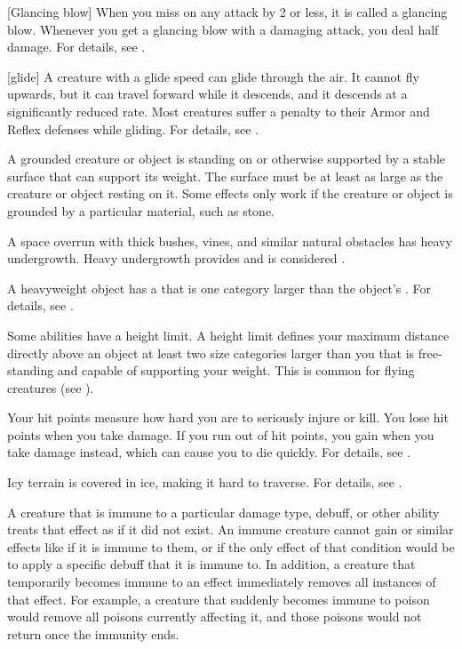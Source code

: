 [Glancing blow] When you miss on any attack by 2 or less, it is called a glancing blow.
Whenever you get a glancing blow with a damaging attack, you deal half damage.
For details, see .

[glide] A creature with a glide speed can glide through the air.
It cannot fly upwards, but it can travel forward while it descends, and it descends at a significantly reduced rate.
Most creatures suffer a  penalty to their Armor and Reflex defenses while gliding.
For details, see .

 A grounded creature or object is standing on or otherwise supported by a stable surface that can support its weight.
The surface must be at least as large as the creature or object resting on it.
Some effects only work if the creature or object is grounded by a particular material, such as stone. 

 A space overrun with thick bushes, vines, and similar natural obstacles has heavy undergrowth.
Heavy undergrowth provides  and is considered .

 A heavyweight object has a  that is one category larger than the object's .
For details, see .

 Some abilities have a height limit.
A height limit defines your maximum distance directly above an object at least two size categories larger than you that is free-standing and capable of supporting your weight.
This is common for flying creatures (see ).

 Your hit points measure how hard you are to seriously injure or kill.
You lose hit points when you take damage.
If you run out of hit points, you gain  when you take damage instead, which can cause you to die quickly.
For details, see .

 Icy terrain is covered in ice, making it hard to traverse.
For details, see .

 A creature that is immune to a particular damage type, debuff, or other ability treats that effect as if it did not exist.
An immune creature cannot gain  or similar effects like  if it is immune to them, or if the only effect of that condition would be to apply a specific debuff that it is immune to.
In addition, a creature that temporarily becomes immune to an effect immediately removes all instances of that effect.
For example, a creature that suddenly becomes immune to poison would remove all poisons currently affecting it, and those poisons would not return once the immunity ends.

